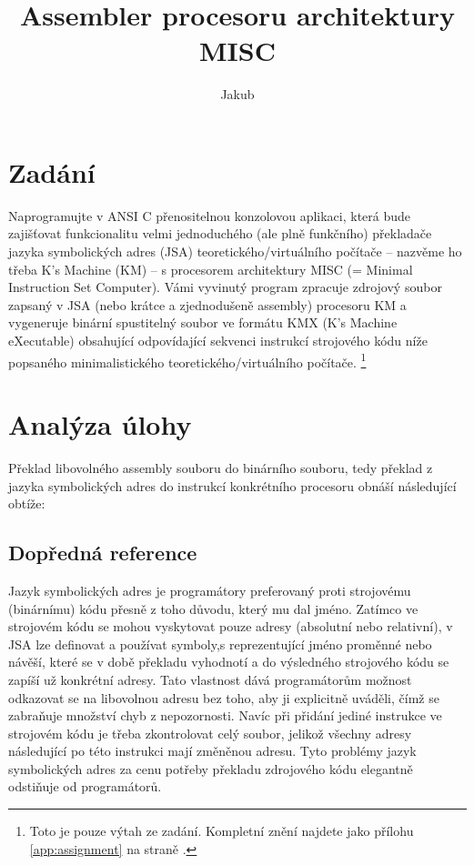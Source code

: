 \documentclass[czech, kiv, he, sem, pdf, viewonly]{fasthesis}
\title{Assembler procesoru architektury MISC}
\author{Jakub}{Vokoun}{}{}
\begin{document}
\frontpages[notm]

\tableofcontents

\chapter{Zadání}

Naprogramujte v ANSI C přenositelnou konzolovou aplikaci, která bude zajišťovat
funkcionalitu velmi jednoduchého (ale plně funkčního) překladače jazyka
symbolických adres (JSA) teoretického/virtuálního počítače – nazvěme ho třeba
K’s Machine (KM) – s procesorem architektury MISC (= Minimal Instruction Set
Computer). Vámi vyvinutý program zpracuje zdrojový soubor zapsaný v JSA (nebo
krátce a zjednodušeně assembly) procesoru KM a vygeneruje binární spustitelný
soubor ve formátu KMX (K’s Machine eXecutable) obsahující odpovídající sekvenci
instrukcí strojového kódu níže popsaného minimalistického
teoretického/virtuálního počítače. \footnote{Toto je pouze výtah ze zadání.
Kompletní znění najdete jako přílohu \ref{app:assignment} na straně
\pageref{app:assignment}.}


\chapter{Analýza úlohy}

Překlad libovolného assembly souboru do binárního souboru, tedy překlad z jazyka
symbolických adres do instrukcí konkrétního procesoru obnáší následující obtíže:

\section{Dopředná reference}

Jazyk symbolických adres je programátory preferovaný proti strojovému
(binárnímu) kódu přesně z toho důvodu, který mu dal jméno. Zatímco ve strojovém
kódu se mohou vyskytovat pouze adresy (absolutní nebo relativní), v JSA lze
definovat a používat symboly,s reprezentující jméno proměnné nebo návěší, které
se v době překladu vyhodnotí a do výsledného strojového kódu se zapíší už
konkrétní adresy. Tato vlastnost dává programátorům možnost odkazovat se na
libovolnou adresu bez toho, aby ji explicitně uváděli, čímž se zabraňuje
množství chyb z nepozornosti. Navíc při přidání jediné instrukce ve strojovém
kódu je třeba zkontrolovat celý soubor, jelikož všechny adresy následující po
této instrukci mají změněnou adresu. Tyto problémy jazyk symbolických adres za
cenu potřeby překladu zdrojového kódu elegantně odstiňuje od programátorů.
\end{document}
